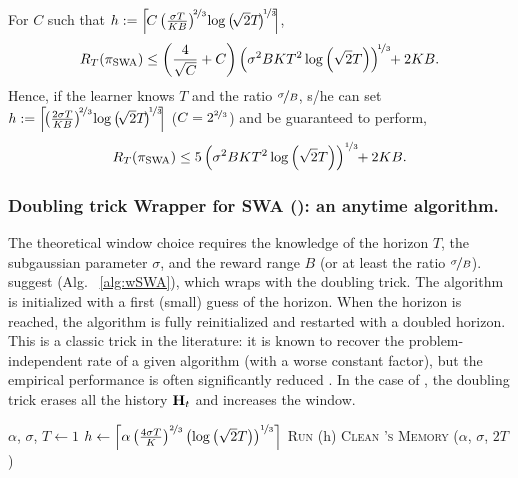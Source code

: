 \begin{corollary}
\label{cor:SWA}
\newcommand*{\Scale}[2][4]{\scalebox{#1}{$#2$}} For $C$ such that $h:= \ceil{\Scale[1]{\!C \pa{\frac{\sigma T}{KB}}^{\!\nicefrac{2}{3}\!}\log\pa{\!\sqrt{2}T\!}^{\!\nicefrac{1}{3}\!}\!}}$,
\[
R_T(\pi_{\rm SWA}) \leq \left(\frac{4}{\sqrt{C}} + C\right) \left(\sigma^2 B K T^2 \log\left(\sqrt{2}T\right)\right)^{\!\nicefrac{1}{3}\!} \!+ 2KB. 
\]
%
Hence, if the learner knows $T$ and the ratio $\nicefrac{\sigma}{B}$, s/he can set $h:= \ceil{\!\pa{\frac{2\sigma T}{KB}}^{\!\nicefrac{2}{3}\!}\log\pa{\!\sqrt{2}T\!}^{\!\nicefrac{1}{3}\!}\!}$ (\ie $C=2^{\nicefrac{2}{3}}$) and be guaranteed to perform,
\[
R_T(\pi_{\rm SWA}) \leq 5 \left(\sigma^2 B K T^2 \log\left(\sqrt{2}T\right)\right)^{\nicefrac{1}{3}\!} \!+ 2KB. 
\]
%
\end{corollary}

\subsubsection*{Doubling trick Wrapper for SWA ({\wSWA}): an anytime algorithm.}
The theoretical window choice requires the knowledge of the horizon $T$, the subgaussian parameter $\sigma$, and the reward range $B$ (or at least the ratio $\nicefrac{\sigma}{B}$).  \citet{levine2017rotting} suggest \wSWA (Alg. ~\ref{alg:wSWA}), which wraps \SWA with the doubling trick. The algorithm is initialized with a first (small) guess of the horizon. When the horizon is reached, the algorithm is fully reinitialized and restarted with a doubled horizon. This is a classic trick in the literature: it is known to recover the problem-independent rate of a given algorithm (with a worse constant factor), but the empirical performance is often significantly reduced \citep{besson2018doubling}. In the case of \wSWA, the doubling trick erases all the history $\mathbf{H}_t$ and increases the window. 

\begin{algorithm}[!h]
\caption{\wSWA \citep{levine2017rotting} }
\label{alg:wSWA}
\begin{algorithmic}[1]
\Require $\alpha$, $\sigma$, $T \gets 1$
\State $h \gets \left\lceil\alpha\left(\frac{4\sigma T}{K}\right)^{\nicefrac{2}{3}}\left(\log\left(\sqrt{2}T\right)\right)^{\nicefrac{1}{3}}\right\rceil$
		\State \textsc{Run} \SWA(h)
	\EndFor
\State \textsc{Clean \SWA's \textsc{Memory}}\label{algline:wSWA-clean}
\State \wSWA($\alpha$, $\sigma$, $2T$) 
\end{algorithmic}
\end{algorithm}

